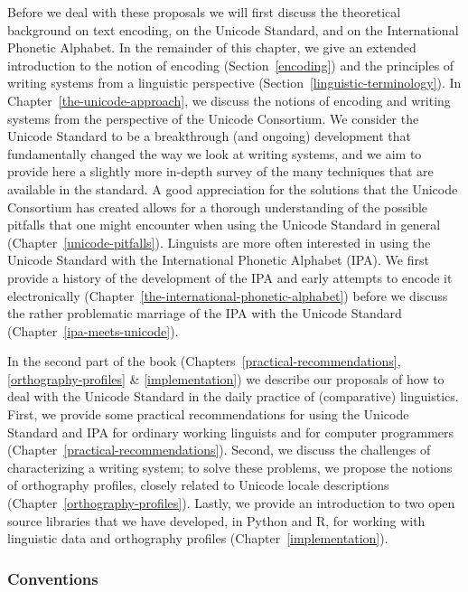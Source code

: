 Before we deal with these proposals we will first discuss the theoretical
background on text encoding, on the Unicode Standard, and on the International
Phonetic Alphabet. In the remainder of this chapter, we give an extended
introduction to the notion of encoding (Section~\ref{encoding}) and the
principles of writing systems from a linguistic perspective
(Section~\ref{linguistic-terminology}). In Chapter~\ref{the-unicode-approach}, we 
discuss the notions of encoding and writing systems from the perspective of the Unicode
Consortium. We consider the Unicode
Standard to be a breakthrough (and ongoing) development that fundamentally
changed the way we look at writing systems, and we aim to provide here a
slightly more in-depth survey of the many techniques that are available in the
standard. A good appreciation for the solutions that the Unicode Consortium has created 
allows for a thorough understanding of the possible pitfalls that one might
encounter when using the Unicode Standard in general (Chapter~\ref{unicode-pitfalls}). Linguists are more often interested in using the Unicode Standard with the International Phonetic Alphabet (IPA). We first provide a history of the development of the IPA and early attempts to encode it electronically (Chapter~\ref{the-international-phonetic-alphabet}) before we discuss the rather problematic marriage of the IPA with the Unicode Standard (Chapter~\ref{ipa-meets-unicode}).

In the second part of the book (Chapters~\ref{practical-recommendations}, \ref{orthography-profiles} \&
\ref{implementation}) we describe our proposals of how to deal with the Unicode
Standard in the daily practice of (comparative) linguistics. First, we provide some 
practical recommendations for using the Unicode Standard and IPA for ordinary 
working linguists and for computer programmers (Chapter~\ref{practical-recommendations}). 
Second, we discuss the
challenges of characterizing a writing system; to solve these problems, we
propose the notions of orthography profiles, closely related to Unicode locale
descriptions (Chapter~\ref{orthography-profiles}). Lastly, we provide an introduction to two open source libraries that we have developed, in Python and R, for working with linguistic data and orthography profiles (Chapter~\ref{implementation}).


\subsubsection*{Conventions}

